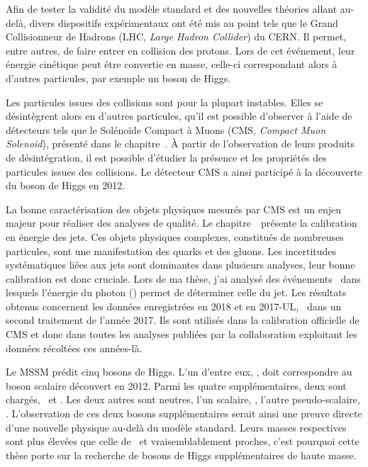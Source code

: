 \par
Afin de tester la validité du modèle standard et des nouvelles théories allant au-delà,
divers dispositifs expérimentaux ont été mis au point
tels que
le Grand Collisionneur de Hadrons (LHC, \emph{Large Hadron Collider})
du CERN.
Il permet, entre autres, de faire entrer en collision des protons.
Lors de cet événement,
leur énergie cinétique
peut être convertie en masse,
celle-ci correspondant alors à d'autres particules,
par exemple un boson de Higgs.
\par
Les particules issues des collisions sont pour la plupart instables.
Elles se désintègrent alors en d'autres particules,
qu'il est possible d'observer à l'aide de détecteurs tels que
le Solénoïde Compact à Muons (CMS, \emph{Compact Muon Solenoid}),
présenté dans le chapitre~.
À partir de l'observation de leurs produits de désintégration,
il est possible d'étudier la présence et les propriétés des particules issues des collisions.
Le détecteur CMS a ainsi participé à la découverte du boson de Higgs en 2012.
\par
La bonne caractérisation des objets physiques mesurés par CMS est un enjeu majeur
pour réaliser des analyses de qualité.
Le chapitre~\ présente la calibration en énergie des jets.
Ces objets physiques complexes, constitués de nombreuses particules,
sont une manifestation des quarks et des gluons.
Les incertitudes systématiques liées aux jets sont dominantes dans plusieurs analyses,
leur bonne calibration est donc cruciale.
Lors de ma thèse, j'ai analysé des événements \Gjets\
dans lesquels l'énergie du photon (\photon) permet de déterminer celle du jet.
Les résultats obtenus
concernent les données enregistrées en 2018 et en 2017-UL,
\ie\ dans un second traitement de l'année 2017.
Ils sont utilisés dans la calibration officielle de CMS
et donc dans toutes les analyses publiées par la collaboration
exploitant les données récoltées ces années-là.
\par
Le MSSM prédit cinq bosons de Higgs.
L'un d'entre eux, \higgs, doit correspondre au boson scalaire découvert en 2012.
Parmi les quatre supplémentaires, deux sont chargés, \Higgsplus\ et \Higgsminus.
Les deux autres sont neutres,
l'un scalaire, \Higgs,
l'autre pseudo-scalaire, \HiggsA.
L'observation de ces deux 
bosons supplémentaires
serait ainsi une preuve directe d'une nouvelle physique au-delà du modèle standard.
Leurs masses respectives sont plus élevées que celle de \higgs\
et vraisemblablement proches,
c'est pourquoi cette thèse porte sur la
recherche de bosons de Higgs supplémentaires de haute masse.
